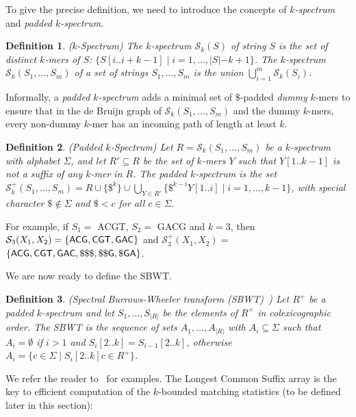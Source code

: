 \documentclass[unnumsec,webpdf,modern,large]{biorxiv}%
\theoremstyle{thmstyleone}%
\theoremstyle{thmstyletwo}%
\theoremstyle{thmstylethree}%
\newtheorem{definition}{Definition}
\begin{document}
To give the precise definition, we need to introduce the concepts of \emph{$k$-spectrum} and \emph{padded $k$-spectrum}.%

\begin{definition}($k$-Spectrum) The $k$-spectrum $\mathcal{S}_k(S)$ of string $S$ is the set of distinct $k$-mers of $S$: $\{S[i..i+k-1] \; | \; i = 1 , \ldots, |S|-k+1\}$.
%
The $k$-spectrum $\mathcal{S}_k(S_1, \ldots, S_m)$ of a set of strings $S_1, \ldots, S_m$ is the union $\bigcup_{i = 1}^m \mathcal{S}_k(S_i)$.
\end{definition}

\noindent Informally, a \emph{padded $k$-spectrum} adds a minimal set of $\$$-padded \emph{dummy} $k$-mers to ensure that in the de Bruijn graph of $\mathcal S_k(S_1, \ldots, S_m)$ and the dummy $k$-mers, every non-dummy $k$-mer has an incoming path of length at least $k$.

\begin{definition}\label{def:padded_k_spectrum} (Padded $k$-Spectrum)
Let $R = \mathcal{S}_k(S_1, \ldots, S_m)$ be a $k$-spectrum with alphabet $\Sigma$, and let $R' \subseteq R$ be the set of $k$-mers $Y$ such that $Y[1..k-1]$ is not a suffix of any $k$-mer in $R$. The padded $k$-spectrum is the set $\mathcal{S}_k^+(S_1, \ldots, S_m) = R \cup \{\$^k\} \cup \bigcup_{Y \in R'} \{\$^{k-i} Y[1..i] \; | \; i = 1, \ldots, k-1\}$, with special character $\$ \not\in \Sigma$ and $\$ < c$ for all $c \in \Sigma$.
\end{definition}
\noindent For example, if $S_1 = $ {\sf ACGT}, $S_2 = $ {\sf GACG} and $k=3$, then $\mathcal{S}_3(X_1, X_2) = \{ {\sf ACG }, {\sf CGT }, {\sf GAC }\}$ and $\mathcal{S}_3^+(X_1, X_2) = $ $\{{\sf ACG }, {\sf CGT}, {\sf GAC }, {\sf \$\$\$}, {\sf \$\$G}, {\sf \$GA} \}$.

We are now ready to define the SBWT.

\begin{definition}\label{def:SBWT}(Spectral Burrows-Wheeler transform (SBWT)~\cite{alanko2023small}) Let $R^+$ be a padded $k$-spectrum and let $S_1, \ldots, S_{|R|}$ be the elements of $R^+$ in colexicographic order. The SBWT is the sequence of sets $A_1, \ldots, A_{|R|}$ with $A_i \subseteq \Sigma$ such that $A_i = \emptyset$ if $i > 1$ and $S_i[2..k] = S_{i-1}[2..k]$, otherwise $A_i = \{c \in \Sigma \; | \; S_i[2..k]c \in R^+\}$.
\end{definition}
\noindent We refer the reader to~\cite{alanko2023longest, alanko2024finimizers, alanko2023small} for examples. The Longest Common Suffix array is the key to efficient computation of the $k$-bounded matching statistics (to be defined later in this section):
\end{document}

